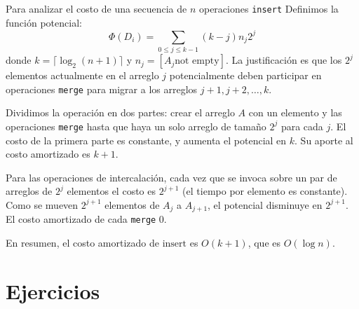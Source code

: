   Para analizar el costo de una secuencia de \(n\) operaciones \verb+insert+
  Definimos la función potencial:
  \begin{equation*}
    \Phi(D_i)
      = \sum_{0 \le j \le k - 1} (k - j) n_j 2^j
  \end{equation*}
  donde \(k = \lceil \log_2 (n + 1) \rceil\)
  y \(n_j = [ A_j \text{not empty} ]\).
  La justificación es que los \(2^j\) elementos actualmente en el arreglo \(j\)
  potencialmente deben participar en operaciones \verb+merge+
  para migrar a los arreglos \(j + 1, j + 2, \dotsc, k\).

  Dividimos la operación en dos partes:
  crear el arreglo \(A\) con un elemento
  y las operaciones \verb+merge+
  hasta que haya un solo arreglo de tamaño \(2^j\) para cada \(j\).
  El costo de la primera parte es constante,
  y aumenta el potencial en \(k\).
  Su aporte al costo amortizado es \(k + 1\).

  Para las operaciones de intercalación,
  cada vez que se invoca sobre un par de arreglos de \(2^j\) elementos
  el costo es \(2^{j + 1}\)
  (el tiempo por elemento es constante).
  Como se mueven \(2^{j + 1}\) elementos de \(A_j\) a \(A_{j + 1}\),
  el potencial disminuye en \(2^{j + 1}\).
  El costo amortizado de cada \verb+merge+ \num{0}.

  En resumen,
  el costo amortizado de \(\mathrm{insert}\) es \(O(k + 1)\),
  que es \(O(\log n)\).

\section*{Ejercicios}
\label{sec:ejercicios-26}

